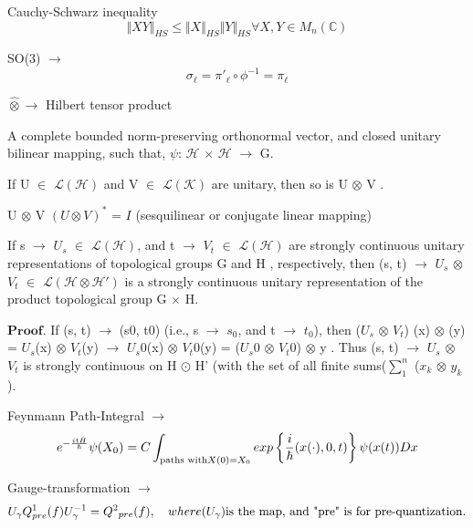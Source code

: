 \documentclass[a4paper, 10pt, onepage]{elegantbook}
\begin{document}
\begin{note}
Cauchy-Schwarz inequality
\begin{equation}
\Vert {XY} \Vert_{HS} \leq \Vert X \Vert_{HS} \Vert Y \Vert_{HS} \forall X,Y \in M_n(\mathbb C)
\end{equation}

SO(3) $\longrightarrow$
\begin{equation}
\sigma_{\ell} = \pi'_{\ell} \circ \phi^{-1} = \pi_\ell
\end{equation}

$\hat \otimes \longrightarrow$ Hilbert tensor product

A complete bounded norm-preserving orthonormal vector, and closed unitary bilinear mapping,
such that, $\psi$: $\mathscr H$ $\times$ $\mathscr H$ $\rightarrow$ G.

If U $\in$ $\mathscr L (\mathscr H)$ and V $\in$ $\mathscr L (\mathscr K)$ are unitary, then so is U $\otimes$ V .

U $\otimes$ V $(U \otimes V )^*$ = $I$ (sesquilinear or conjugate linear mapping)

If s $\rightarrow$ $U_s$ $\in$ $\mathscr L (\mathscr H)$, and t $\rightarrow$ $V_t$ $\in$ $\mathscr L (\mathscr H)$ are 
strongly continuous unitary representations of topological groups G and H , respectively, then (s, t) $\rightarrow$ 
$U_s$ $\otimes$ $V_t$ $\in$ $\mathscr L (\mathscr H \otimes \mathscr H')$ is a strongly continuous unitary 
representation of the product topological group G $\times$ H.

$\mathbf{\textbf{Proof}}$. If (s, t) $\rightarrow$ (s0, t0) (i.e., s $\rightarrow$  $s_0$, and t $\rightarrow$ $t_0$), 
then ($U_s$ $\otimes$ $V_t$) (x) $\otimes$ (y) = $U_s$(x) $\otimes$ $V_t$(y) $\rightarrow$ $U_s0$(x) $\otimes$ 
$V_t0$(y) = ($U_s0$ $\otimes$ $V_t0$)  $\otimes$ y . Thus (s, t) $\rightarrow$ $U_s$ $\otimes$ $V_t$ is strongly 
continuous on H $\odot$ H' (with the set of all finite sums($\sum_{1}^n$ ($x_k$ $\otimes$ $y_k$).

Feynmann Path-Integral $\longrightarrow$
\begin{equation}
e^{- \frac{i t \hat {H}}{\hbar}} \psi (X_0) = C \int_{\text{paths with} \\ X(0)=X_0} exp\left\{ 
\frac{i}{\hbar}(x(\cdot),0,t) \right\} \psi(x(t)) Dx
\end{equation}
 
Gauge-transformation $\longrightarrow$
\begin{equation} \label{eq:Gauge-transformation}
U_\gamma Q^{1}_{pre}(f)U^{-1}_{\gamma} = Q^{2}{_{pre}}(f), \quad where (U_\gamma) \text{is the map, and "pre" is for 
pre-quantization\index{pre-quantization}}.
\end{equation}


\end{note}
\end{document}
